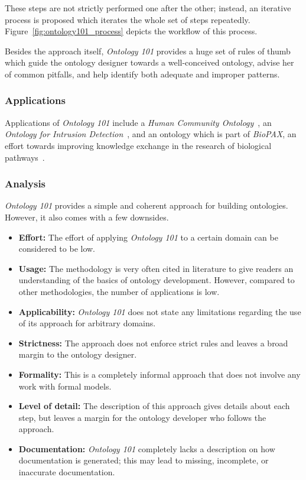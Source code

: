 These steps are not strictly performed one after the other; instead, an iterative process is proposed which iterates the whole set of steps repeatedly. Figure~\ref{fig:ontology101_process} depicts the workflow of this process.

Besides the approach itself, \emph{Ontology 101} provides a huge set of rules of thumb which guide the ontology designer towards a well-conceived ontology, advise her of common pitfalls, and help identify both adequate and improper patterns.

\subsubsection{Applications}

Applications of \emph{Ontology 101} include a \emph{Human Community Ontology}~\cite{HumanCommunityOntology}, an \emph{Ontology for Intrusion Detection}~\cite{IDSOntology}, and an ontology which is part of \emph{BioPAX}, an effort towards improving knowledge exchange in the research of biological pathways~\cite{BioPAX}.

\subsubsection{Analysis}

\emph{Ontology 101} provides a simple and coherent approach for building ontologies. However, it also comes with a few downsides.

\begin{itemize}
  \item \textbf{Effort:} The effort of applying \emph{Ontology 101} to a certain domain can be considered to be low.
  
   \item \textbf{Usage:} The methodology is very often cited in literature to give readers an understanding of the basics of ontology development. However, compared to other methodologies, the number of applications is low.
  
  \item \textbf{Applicability:} \emph{Ontology 101} does not state any limitations regarding the use of its approach for arbitrary domains.
  
  \item \textbf{Strictness:} The approach does not enforce strict rules and leaves a broad margin to the ontology designer.
  
  \item \textbf{Formality:} This is a completely informal approach that does not involve any work with formal models.
  
  \item \textbf{Level of detail:} The description of this approach gives details about each step, but leaves a margin for the ontology developer who follows the approach.
  
  \item \textbf{Documentation:} \emph{Ontology 101} completely lacks a description on how documentation is generated; this may lead to missing, incomplete, or inaccurate documentation.
\end{itemize}

